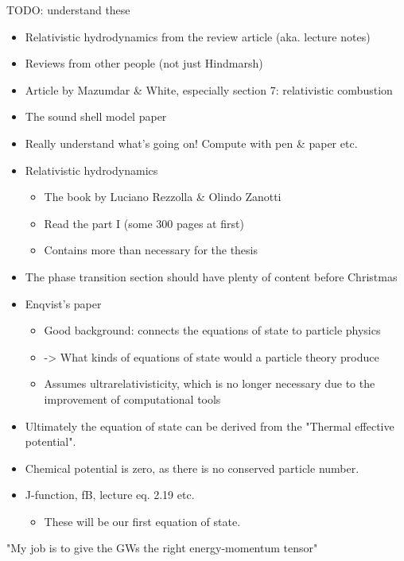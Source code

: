 TODO: understand these
\begin{itemize}
    \item Relativistic hydrodynamics from the review article (aka. lecture notes) \cite{lecture_notes}
    \item Reviews from other people (not just Hindmarsh)
    \item Article by Mazumdar \& White, especially section 7: relativistic combustion \cite{mazumdar_review_2019}
    \item The sound shell model paper
    \item Really understand what's going on! Compute with pen \& paper etc.
    \item Relativistic hydrodynamics
    \begin{itemize}
        \item The book by Luciano Rezzolla \& Olindo Zanotti \cite{rezzolla_relativistic_2013}
        \item Read the part I (some 300 pages at first)
        \item Contains more than necessary for the thesis
    \end{itemize}
    \item The phase transition section should have plenty of content before Christmas
    \item Enqvist's paper
    \begin{itemize}
        \item Good background: connects the equations of state to particle physics
        \item -> What kinds of equations of state would a particle theory produce
        \item Assumes ultrarelativisticity, which is no longer necessary due to the improvement of computational tools
    \end{itemize}
    \item Ultimately the equation of state can be derived from the "Thermal effective potential".
    \item Chemical potential is zero, as there is no conserved particle number.
    \item J-function, fB, lecture eq. 2.19 etc.
    \begin{itemize}
        \item These will be our first equation of state.
    \end{itemize}
\end{itemize}

"My job is to give the GWs the right energy-momentum tensor"
\fi

